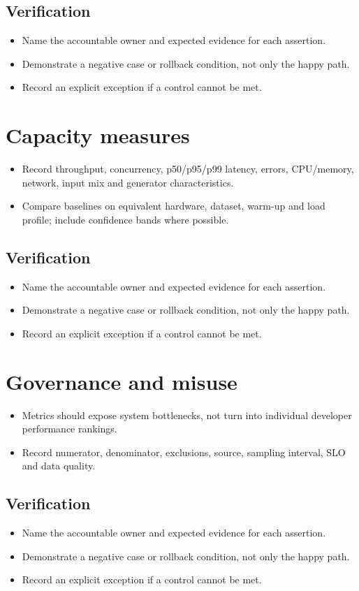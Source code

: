 \documentclass[10pt,letterpaper]{article}
\begin{document}
\subsection{Verification}
\begin{itemize}
\item Name the accountable owner and expected evidence for each assertion.
\item Demonstrate a negative case or rollback condition, not only the happy path.
\item Record an explicit exception if a control cannot be met.
\end{itemize}


\section{Capacity measures}
\begin{itemize}
\item Record throughput, concurrency, p50/p95/p99 latency, errors, CPU/memory, network, input mix and generator characteristics.
\item Compare baselines on equivalent hardware, dataset, warm-up and load profile; include confidence bands where possible.
\end{itemize}
\subsection{Verification}
\begin{itemize}
\item Name the accountable owner and expected evidence for each assertion.
\item Demonstrate a negative case or rollback condition, not only the happy path.
\item Record an explicit exception if a control cannot be met.
\end{itemize}


\section{Governance and misuse}
\begin{itemize}
\item Metrics should expose system bottlenecks, not turn into individual developer performance rankings.
\item Record numerator, denominator, exclusions, source, sampling interval, SLO and data quality.
\end{itemize}
\subsection{Verification}
\begin{itemize}
\item Name the accountable owner and expected evidence for each assertion.
\item Demonstrate a negative case or rollback condition, not only the happy path.
\item Record an explicit exception if a control cannot be met.
\end{itemize}
\end{document}

